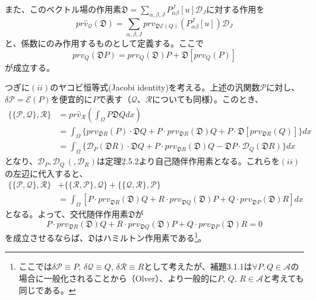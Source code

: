 \documentclass[a4paper, 11pt]{report}
\theoremstyle{definition}
\begin{document}
 また、このベクトル場の作用素$\mathfrak{D}=\sum_{\alpha ,\beta ,J}P_{\alpha\beta}^J[u]\mathcal{D}_J$に対する作用を
\begin{equation*}
pr\hat{v}_\mathcal{Q}(\mathfrak{D}) = \sum_{\alpha ,\beta ,J}prv_{\mathfrak{D}\mathcal{E}(Q)}(P_{\alpha\beta}^J[u])\mathcal{D}_J
\end{equation*}
と、係数にのみ作用するものとして定義する。ここで
\begin{equation*}
prv_Q(\mathfrak{D}P) = prv_Q(\mathfrak{D}) P + \mathfrak{D} [prv_Q(P)]
\end{equation*}
が成立する。

 つぎに$(ii)$のヤコビ恒等式(Jacobi identity)を考える。上述の汎関数$\mathcal{P}$に対し、$\delta\mathcal{P}=\mathcal{E}(P)$を便宜的に$P$で表す（$\mathcal{Q}$、$\mathcal{R}$についても同様）。このとき、
\begin{align*}
\{ \{ \mathcal{P}, \mathcal{Q} \}, \mathcal{R} \} &= pr\hat{v}_\mathcal{R}(\int_\Omega P\mathfrak{D}Qdx)\\
&= \int_\Omega \{ prv_{\mathfrak{D}R}(P)\cdot\mathfrak{D}Q + P\cdot prv_{\mathfrak{D}R}(\mathfrak{D}) Q + P\cdot \mathfrak{D}[prv_{\mathfrak{D}R}(Q)] \} dx\\
&= \int_\Omega \{ \mathcal{D}_P(\mathfrak{D}R)\cdot\mathfrak{D}Q + P\cdot prv_{\mathfrak{D}R}(\mathfrak{D}) Q - \mathfrak{D}P\cdot \mathcal{D}_Q(\mathfrak{D}R) \} dx
\end{align*}
となり、$\mathcal{D}_P, \mathcal{D}_Q\, (, \mathcal{D}_R)$は定理2.5.2より自己随伴作用素となる。これらを$(ii)$の左辺に代入すると、
\begin{align}
\{ \{ \mathcal{P}, \mathcal{Q} \}, \mathcal{R} \} &+ \{ \{ \mathcal{R}, \mathcal{P} \}, \mathcal{Q} \} + \{ \{ \mathcal{Q}, \mathcal{R} \}, \mathcal{P} \}\nonumber\\
&= \int_\Omega [P\cdot prv_{\mathfrak{D}R}(\mathfrak{D}) Q + R\cdot prv_{\mathfrak{D}Q}(\mathfrak{D}) P + Q\cdot prv_{\mathfrak{D}P}(\mathfrak{D}) R]dx  %
\end{align}
となる。よって、交代随伴作用素$\mathfrak{D}$が
\begin{equation}
P\cdot prv_{\mathfrak{D}R}(\mathfrak{D}) Q + R\cdot prv_{\mathfrak{D}Q}(\mathfrak{D}) P + Q\cdot prv_{\mathfrak{D}P}(\mathfrak{D}) R = 0  %
\end{equation}
を成立させるならば、$\mathfrak{D}$はハミルトン作用素である\footnote{ここでは$\delta\mathcal{P}\equiv P,\, \delta\mathcal{Q}\equiv Q,\, \delta\mathcal{R}\equiv R$として考えたが、補題3.1.1は$\forall P,Q\in \mathcal{A}$の場合に一般化されることから（Olver\cite[Chap.7]{Olver4}）、より一般的に$P, \, Q, \, R\in\mathcal{A}$と考えても同じである。}。
\end{document}
